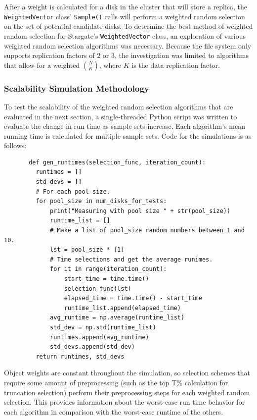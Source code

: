 \documentclass[12pt]{article}
\begin{document}
  After a weight is calculated for a disk in the cluster that will store a
  replica, the \texttt{WeightedVector} class' \texttt{Sample()} calls will
  perform a weighted random selection on the set of potential candidate disks.
  To determine the best method of weighted random selection for Stargate's
  \texttt{WeightedVector} class, an exploration of various weighted random
  selection algorithms was necessary.  Because the file system only supports
  replication factors of 2 or 3, the investigation was limited to algorithms
  that allow for a weighted $\binom{N}{K}$, where $K$ is the data replication
  factor.

    \subsubsection{Scalability Simulation Methodology}
     To test the scalability of the weighted random selection algorithms that
     are evaluated in the next section, a single-threaded Python \cite{python}
     script was written to evaluate the change in run time as sample sets
     increase. Each algorithm's mean running time is calculated for multiple
     sample sets. Code for the simulations is as follows:

     \singlespace
     \begin{tcolorbox}
     \begin{verbatim}
       def gen_runtimes(selection_func, iteration_count):
         runtimes = []
         std_devs = []
         # For each pool size.
         for pool_size in num_disks_for_tests:
             print("Measuring with pool size " + str(pool_size))
             runtime_list = []
             # Make a list of pool_size random numbers between 1 and 10.
             lst = pool_size * [1]
             # Time selections and get the average runimes.
             for it in range(iteration_count):
                 start_time = time.time()
                 selection_func(lst)
                 elapsed_time = time.time() - start_time
                 runtime_list.append(elapsed_time)
             avg_runtime = np.average(runtime_list)
             std_dev = np.std(runtime_list)
             runtimes.append(avg_runtime)
             std_devs.append(std_dev)
         return runtimes, std_devs
     \end{verbatim}
     \end{tcolorbox}
     \doublespace
        
    Object weights are constant throughout the simulation, so selection schemes
    that require some amount of preprocessing (such as the top T\% calculation
    for truncation selection) perform their preprocessing steps for each
    weighted random selection. This provides information about the worst-case
    run time behavior for each algorithm in comparison with the worst-case
    runtime of the others.
\end{document}
